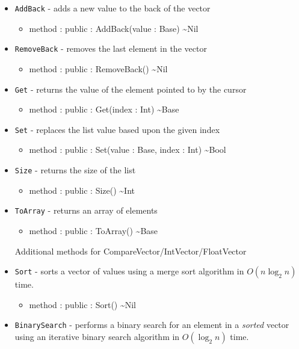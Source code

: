 \documentclass[12pt]{article}
\begin{document}
\begin{itemize}
\item \texttt{AddBack} - adds a new value to the back of the vector
  \begin{itemize}
  \item method : public : AddBack(value : Base) \textasciitilde Nil
  \end{itemize}
\item \texttt{RemoveBack} - removes the last element in the vector
  \begin{itemize}
  \item method : public : RemoveBack() \textasciitilde Nil
  \end{itemize}
\item \texttt{Get} - returns the value of the element pointed to by
  the cursor
  \begin{itemize}
  \item method : public : Get(index : Int) \textasciitilde Base
  \end{itemize}
\item \texttt{Set} - replaces the list value based upon the given
  index
  \begin{itemize}
  \item method : public : Set(value : Base, index : Int) \textasciitilde Bool
  \end{itemize}
\item \texttt{Size} - returns the size of the list
  \begin{itemize}
  \item method : public : Size() \textasciitilde Int
  \end{itemize}
\item \texttt{ToArray} - returns an array of elements
  \begin{itemize}
  \item method : public : ToArray() \textasciitilde Base
  \end{itemize}
  Additional methods for CompareVector/IntVector/FloatVector
\item \texttt{Sort} - sorts a vector of values using a merge sort
  algorithm in $O(n \log_2 n)$ time.
  \begin{itemize}
  \item method : public : Sort() \textasciitilde Nil
  \end{itemize}
\item \texttt{BinarySearch} - performs a binary search for an element
  in a \emph{sorted} vector using an iterative binary search algorithm
  in $O(\log_2 n)$ time.
  \begin{itemize}

\end{itemize}
\end{itemize}
\end{document}
